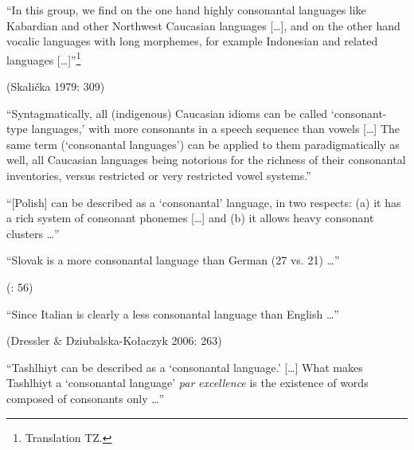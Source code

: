 \ea\label{ex:(1.13)}
   “In this group, we find on the one hand highly consonantal languages like Kabardian and other Northwest Caucasian languages […], and on the other hand vocalic languages with long morphemes, for example Indonesian and related languages […]”\footnote{ \textrm{Translation TZ.}}



(Skalička 1979: 309)
\z



\ea\label{ex:(1.14)}
   “Syntagmatically, all (indigenous) Caucasian idioms can be called ‘consonant-type languages,’ with more consonants in a speech sequence than vowels […] The same term (‘consonantal languages’) can be applied to them paradigmatically as well, all Caucasian languages being notorious for the richness of their consonantal inventories, versus restricted or very restricted vowel systems.” 



\citep[43]{Chirikba2008}
\z



\ea\label{ex:(1.15)}
  “[Polish] can be described as a ‘consonantal’ language, in two respects: (a) it has a rich system of consonant phonemes […] and (b) it allows heavy consonant clusters …” 



\citep[103]{Jassem2003}
\z



\ea\label{ex:(1.16)}
   “Slovak is a more consonantal language than German (27 vs. 21) …”



(\citealt{DresslerEtAl2015}: 56)
\z



\ea\label{ex:(1.17)}
  “Since Italian is clearly a less consonantal language than English …” 



(Dressler \& Dziubalska-Kołaczyk 2006: 263)
\z



\ea\label{ex:(1.18)}
  “Tashlhiyt can be described as a ‘consonantal language.’ […] What makes Tashlhiyt a ‘consonantal language’ \textit{par} \textit{excellence} is the existence of words composed of consonants only …” 
\z



\citep[216]{Ridouane2014}



